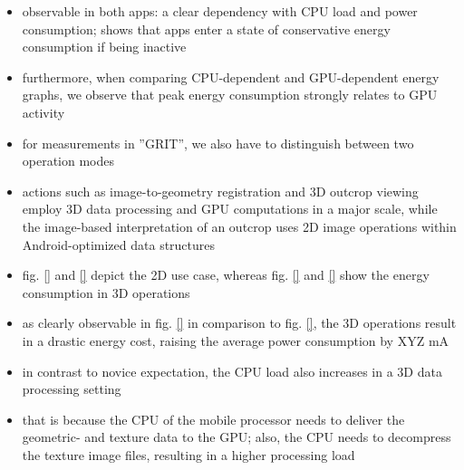 \documentclass[review]{elsarticle}
\begin{document}
\begin{itemize}
\item observable in both apps: a clear dependency with \gls{CPU} load and power consumption; shows that apps enter a state of conservative energy consumption if being inactive
\item furthermore, when comparing \gls{CPU}-dependent and \gls{GPU}-dependent energy graphs, we observe that peak energy consumption strongly relates to \gls{GPU} activity
\item for measurements in ''\gls{GRIT}'', we also have to distinguish between two operation modes
\item actions such as image-to-geometry registration \cite{} and 3D outcrop viewing employ 3D data processing and \gls{GPU} computations in a major scale, while the image-based interpretation of an outcrop uses 2D image operations within Android-optimized data structures
\item fig. \ref{} and \ref{} depict the 2D use case, whereas fig. \ref{} and \ref{} show the energy consumption in 3D operations
\end{itemize}

\begin{itemize}
\item as clearly observable in fig. \ref{} in comparison to fig. \ref{}, the 3D operations result in a drastic energy cost, raising the average power consumption by XYZ mA
\item in contrast to novice expectation, the \gls{CPU} load also increases in a 3D data processing setting
\item that is because the \gls{CPU} of the mobile processor needs to deliver the geometric- and texture data to the \gls{GPU}; also, the \gls{CPU} needs to decompress the texture image files, resulting in a higher processing load
\end{itemize}
\end{document}
